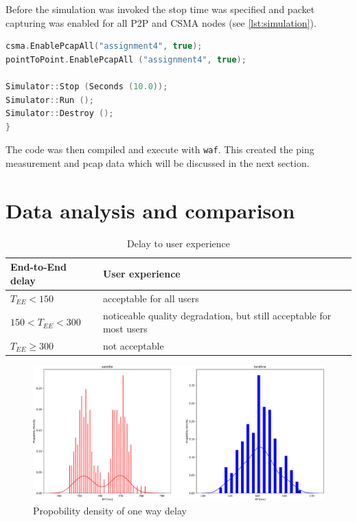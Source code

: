 \documentclass[parskip=full]{scrartcl}
\begin{document}
Before the simulation was invoked the stop time was specified and packet capturing was enabled for all P2P and CSMA nodes (see \cref{lst:simulation}).

\begin{lstlisting}[language=c++, frame=single , captionpos=b, caption={pcap and simulation start}, label=lst:simulation]
csma.EnablePcapAll("assignment4", true);
pointToPoint.EnablePcapAll ("assignment4", true);

Simulator::Stop (Seconds (10.0));
Simulator::Run ();
Simulator::Destroy ();
}
\end{lstlisting}

The code was then compiled and execute with \verb|waf|. This created the ping measurement and pcap data which will be discussed in the next section. 

\section{Data analysis and comparison} \label{sec:data}


\begin{table}[hb]
	\centering
	\begin{tabular}{ll}
		\toprule
		\textbf{End-to-End delay} & \textbf{User experience} \\ \midrule
			$T_{EE} < 150$ & acceptable for all users \\
			$150 < T_{EE} < 300$ & noticeable quality degradation, but still acceptable for most users\\
			$T_{EE} \geq 300$ & not acceptable\\
			\bottomrule
		\end{tabular}
		\caption{Delay to user experience}
		\label{tab:delayEnd2End}
	\end{table}

\begin{figure}[!ht]
	\centering %
	\includegraphics[width=\textwidth]{images/oneWayDelay.pdf} %
	\caption{Propobility density of one way delay} 
	\label{fig:one-way-delay} %
\end{figure}
\end{document}
